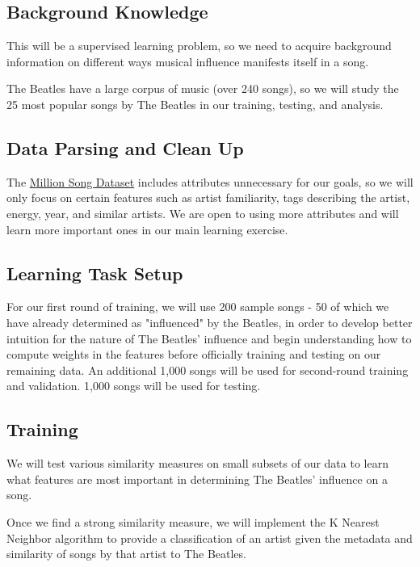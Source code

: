 \documentclass{article}
\begin{document}
\subsection{Background Knowledge}
This will be a supervised learning problem, so we need to acquire background information on different ways musical influence manifests itself in a song.

The Beatles have a large corpus of music (over 240 songs), so we will study the 25 most popular songs by The Beatles in our training, testing, and analysis.

\subsection{Data Parsing and Clean Up} 
The \href{http://labrosa.ee.columbia.edu/millionsong/}{Million Song Dataset} includes attributes unnecessary for our goals, so we will only focus on certain features such as artist familiarity, tags describing the artist, energy, year, and similar artists. We are open to using more attributes and will learn more important ones in our main learning exercise.

\subsection{Learning Task Setup} 
For our first round of training, we will use 200 sample songs - 50 of which we have already determined as "influenced" by the Beatles, in order to develop better intuition for the nature of The Beatles' influence and begin understanding how to compute weights in the features before officially training and testing on our remaining data. An additional 1,000 songs will be used for second-round training and validation. 1,000 songs will be used for testing.  

\subsection{Training}
We will test various similarity measures on small subsets of our data to learn what features are most important in determining The Beatles' influence on a song. \par
Once we find a strong similarity measure, we will implement the K Nearest Neighbor algorithm to provide a classification of an artist given the metadata and similarity of songs by that artist to The Beatles.\par

\end{document}
